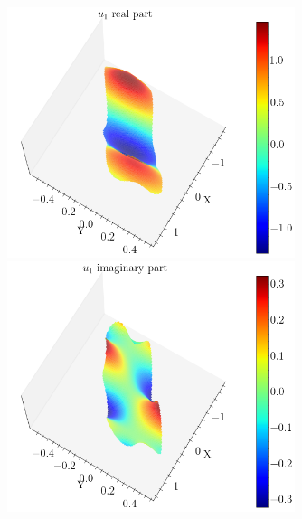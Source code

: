 \begin{figure}[!htb]
    \centering
    \begin{minipage}[b]{0.45\textwidth}
        \centering
        \includegraphics[width=0.75\textwidth]{Images/Dirac/smooth/optimal_lambda3_m_1_u1_re.png}
    \end{minipage}
    \hfill
    \begin{minipage}[b]{0.45\textwidth}
        \centering
        \includegraphics[width=0.75\textwidth]{Images/Dirac/smooth/optimal_lambda3_m_1_u1_im.png}
    \end{minipage}

    \vspace{0.5cm}


\end{figure}
